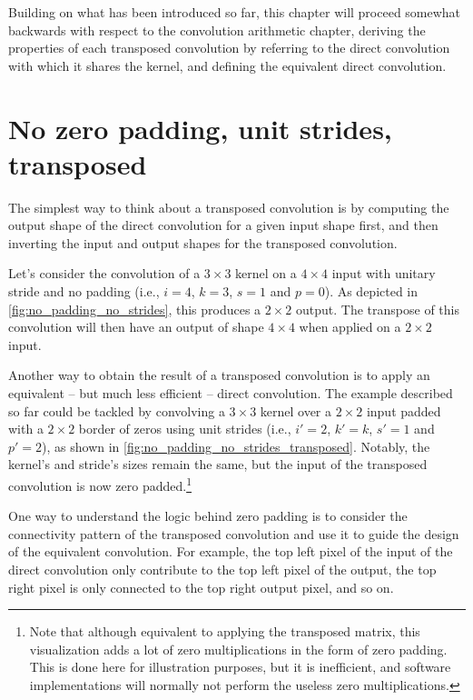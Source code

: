 \documentclass[notitlepage]{report}
\begin{document}
Building on what has been introduced so far, this chapter will proceed somewhat
backwards with respect to the convolution arithmetic chapter, deriving the
properties of each transposed convolution by referring to the direct
convolution with which it shares the kernel, and defining the equivalent direct
convolution.

\section{No zero padding, unit strides, transposed}

The simplest way to think about a transposed convolution is by computing the
output shape of the direct convolution for a given input shape first, and then
inverting the input and output shapes for the transposed convolution.

Let's consider the convolution of a $3 \times 3$ kernel on a $4 \times 4$
input with unitary stride and no padding (i.e., $i = 4$, $k = 3$, $s = 1$ and
$p = 0$). As depicted in \autoref{fig:no_padding_no_strides}, this produces a
$2 \times 2$ output. The transpose of this convolution will then have an output
of shape $4 \times 4$ when applied on a $2 \times 2$ input.

Another way to obtain the result of a transposed convolution is to apply an
equivalent -- but much less efficient -- direct convolution. The example
described so far could be tackled by convolving a $3 \times 3$ kernel over a
$2 \times 2$ input padded with a $2 \times 2$ border of zeros using unit
strides (i.e., $i' = 2$, $k' = k$, $s' = 1$ and $p' = 2$), as shown in
\autoref{fig:no_padding_no_strides_transposed}. Notably, the kernel's and
stride's sizes remain the same, but the input of the transposed convolution is
now zero padded.\footnote{Note that although
    equivalent to applying the transposed matrix, this visualization adds a lot
    of zero multiplications in the form of zero padding.  This is done here for
    illustration purposes, but it is inefficient, and software implementations
    will normally not perform the useless zero multiplications.}

One way to understand the logic behind zero padding is to consider the
connectivity pattern of the transposed convolution and use it to guide the
design of the equivalent convolution. For example, the top left pixel of the
input of the direct convolution only contribute to the top left pixel of the
output, the top right pixel is only connected to the top right output pixel,
and so on.
\end{document}
